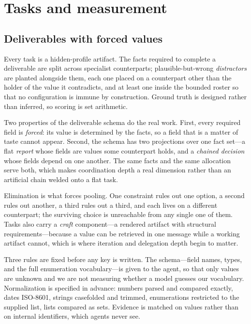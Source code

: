\section{Tasks and measurement}
\label{sec:measurement}

\subsection{Deliverables with forced values}

Every task is a hidden-profile artifact. The facts required to complete a deliverable
are split across specialist counterparts; plausible-but-wrong \emph{distractors} are
planted alongside them, each one placed on a counterpart other than the holder of the
value it contradicts, and at least one inside the bounded roster so that no
configuration is immune by construction. Ground truth is designed rather than
inferred, so scoring is set arithmetic.

Two properties of the deliverable schema do the real work. First, every required
field is \emph{forced}: its value is determined by the facts, so a field that is a
matter of taste cannot appear. Second, the schema has two projections over one fact
set---a flat \emph{report} whose fields are values some counterpart holds, and a
\emph{chained decision} whose fields depend on one another. The same facts and the
same allocation serve both, which makes coordination depth a real dimension rather
than an artificial chain welded onto a flat task.

Elimination is what forces pooling. One constraint rules out one option, a second
rules out another, a third rules out a third, and each lives on a different
counterpart; the surviving choice is unreachable from any single one of them. Tasks
also carry a \emph{craft} component---a rendered artifact with structural
requirements---because a value can be retrieved in one message while a working
artifact cannot, which is where iteration and delegation depth begin to matter.

Three rules are fixed before any key is written. The schema---field names, types, and
the full enumeration vocabulary---is given to the agent, so that only values are
unknown and we are not measuring whether a model guesses our vocabulary.
Normalization is specified in advance: numbers parsed and compared exactly, dates
ISO-8601, strings casefolded and trimmed, enumerations restricted to the supplied
list, lists compared as sets. Evidence is matched on values rather than on internal
identifiers, which agents never see.

